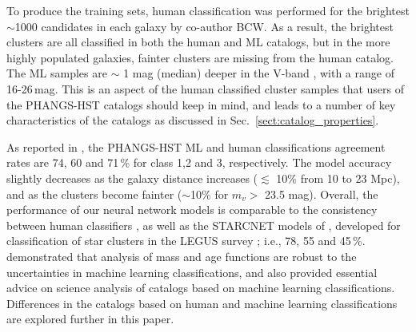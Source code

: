 \documentclass[linenumbers]{aastex63}
\begin{document}
To produce the training sets, human classification was performed for the brightest $\sim$1000 candidates 
in each galaxy by co-author BCW. %
As a result, the brightest clusters are all classified in both the human and ML catalogs, but in the more highly populated galaxies, fainter clusters are missing from the human catalog.  The ML samples are $\sim$ 1 mag (median) deeper in the V-band \citep[and Section~\ref{ssect:v_mag}]{whitmore_star_2021}, with a range of 16-26\,mag. %
This is an aspect of the human classified cluster samples that users of the PHANGS-HST catalogs should keep in mind, and leads to a number of key characteristics of the catalogs as discussed in Sec.~\ref{sect:catalog_properties}.   

As reported in \citet{hannon_star_2023}, the PHANGS-HST ML and human classifications agreement rates are 74, 60 and 71\,\% for class 1,2 and 3, respectively.  
The model accuracy slightly decreases as the galaxy distance increases ($\lesssim$ 10\% from 10 to 23 Mpc), and as the clusters become fainter ($\sim$10\% for $m_v>$ 23.5 mag).
Overall, the performance of our neural network models is comparable to the consistency between human classifiers \citep{wei_deep_2020, whitmore_star_2021}, as well as the \textsc{STARCNET} models of \citet{perez_starcnet_2021}, developed for classification of star clusters in the LEGUS survey \citep{calzetti_legacy_2015, linden_star_2022}; i.e., 78, 55 and 45\,\%.   \citet{whitmore_star_2021} demonstrated that analysis of mass and age functions are robust to the uncertainties in machine learning classifications, and also provided essential advice on science analysis of catalogs based on machine learning classifications.  Differences in the catalogs based on human and machine learning classifications are explored further in this paper.

\end{document}
